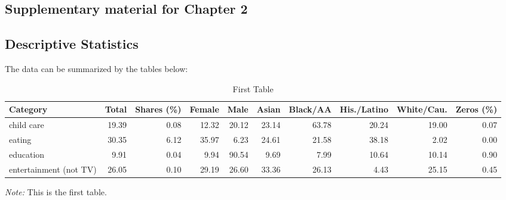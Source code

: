 \documentclass[letterpaper]{report}
\begin{document}
\begin{appendices}
  \chapter{Supplementary material for Chapter 2}
  
  \setcounter{table}{0}
  
  \section{Descriptive Statistics}
  
  The data can be summarized by the tables below:
  
  \renewcommand*\arraystretch{0.95}
  \renewcommand{\tabcolsep}{2.5pt}
  \begin{table}[H]
    \renewcommand{\thetable}{B.\arabic{table}a}
    \caption{First Table}
    \label{summary_a}
    \fontsize{10}{11}\selectfont
    \hspace*{-0.5cm}
    \begin{tabular}{lrrrrrrrrr}
      \toprule
      Category                   & Total & Shares (\%) & Female & Male  & Asian & Black/AA & His./Latino & White/Cau. & Zeros (\%) \\ \hline
      child care                 & 19.39 & 0.08   & 12.32  & 20.12 & 23.14 & 63.78    & 20.24       & 19.00      & 0.07  \\
      eating                     & 30.35 & 6.12   & 35.97  & 6.23 & 24.61 & 21.58    & 38.18       & 2.02      & 0.00  \\
      education                  & 9.91  & 0.04   & 9.94   & 90.54  & 9.69  & 7.99     & 10.64        & 10.14      & 0.90  \\
      entertainment (not TV)     & 26.05 & 0.10   & 29.19  & 26.60 & 33.36 & 26.13    & 4.43       & 25.15      & 0.45  \\ \bottomrule
    \end{tabular}
    \hspace*{-1cm}
    \begin{minipage}{1\textwidth}
      \onehalfspacing
      \vspace*{0.05cm}
      \begin{tablenotes}
        \footnotesize
        \item\textit{Note:} This is the first table.
      \end{tablenotes}
    \end{minipage}
  \end{table}
  

\end{appendices}
\end{document}
